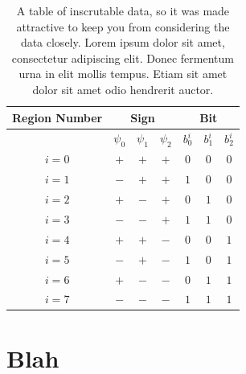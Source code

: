     \begin{table}[p]
        \caption[A table of inscrutable data, so it was made attractive to keep you from considering the data closely.]
                {A table of inscrutable data, so it was made attractive to keep you from considering the data closely.
                    Lorem ipsum dolor sit amet, consectetur adipiscing elit. Donec fermentum 
                    urna in elit mollis tempus. Etiam sit amet dolor sit amet odio hendrerit 
                    auctor. 
                    }
        \begin{center}
            \begin{tabular}{|c|c|c|c|c|c|c|} \hline
                Region Number & \multicolumn{3}{|c|}{Sign}           & \multicolumn{3}{|c|}{Bit} \\ \hline
                              & \(\psi_0\) & \(\psi_1\) & \(\psi_2\) & \(b^i_0\) & \(b^i_1\) & \(b^i_2\) \\ \hline
                \(i = 0\)     & \(+\)      & \(+\)      & \(+\)      & \(0\)     & \(0\)     & \(0\)   \\ \hline
                \(i = 1\)     & \(-\)      & \(+\)      & \(+\)      & \(1\)     & \(0\)     & \(0\)   \\ \hline
                \(i = 2\)     & \(+\)      & \(-\)      & \(+\)      & \(0\)     & \(1\)     & \(0\)   \\ \hline
                \(i = 3\)     & \(-\)      & \(-\)      & \(+\)      & \(1\)     & \(1\)     & \(0\)   \\ \hline
                \(i = 4\)     & \(+\)      & \(+\)      & \(-\)      & \(0\)     & \(0\)     & \(1\)   \\ \hline
                \(i = 5\)     & \(-\)      & \(+\)      & \(-\)      & \(1\)     & \(0\)     & \(1\)   \\ \hline
                \(i = 6\)     & \(+\)      & \(-\)      & \(-\)      & \(0\)     & \(1\)     & \(1\)   \\ \hline
                \(i = 7\)     & \(-\)      & \(-\)      & \(-\)      & \(1\)     & \(1\)     & \(1\)   \\ \hline
            \end{tabular}
        \end{center}
        \label{tab:multiregion-encoding-2}
    \end{table}

\section{Blah}

